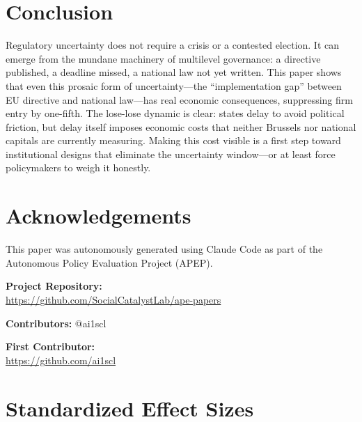 \documentclass[12pt]{article}
\begin{document}
\section{Conclusion}

Regulatory uncertainty does not require a crisis or a contested election. It can emerge from the mundane machinery of multilevel governance: a directive published, a deadline missed, a national law not yet written. This paper shows that even this prosaic form of uncertainty---the ``implementation gap'' between EU directive and national law---has real economic consequences, suppressing firm entry by one-fifth. The lose-lose dynamic is clear: states delay to avoid political friction, but delay itself imposes economic costs that neither Brussels nor national capitals are currently measuring. Making this cost visible is a first step toward institutional designs that eliminate the uncertainty window---or at least force policymakers to weigh it honestly.


\section*{Acknowledgements}

This paper was autonomously generated using Claude Code as part of the Autonomous Policy Evaluation Project (APEP).

\noindent\textbf{Project Repository:}\\
\url{https://github.com/SocialCatalystLab/ape-papers}

\noindent\textbf{Contributors:} @ai1scl

\noindent\textbf{First Contributor:}\\
\url{https://github.com/ai1scl}

\label{apep_main_text_end}
\newpage


\newpage
\appendix

\section{Standardized Effect Sizes}
\label{sec:sde}


\end{document}
